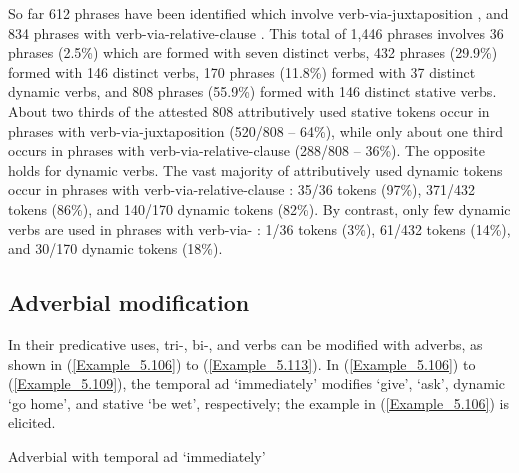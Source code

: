 So far 612  phrases have been identified which involve verb-via-juxtapos\-ition , and 834  phrases with verb-via-relative-clause . This total of 1,446  phrases involves 36  phrases (2.5\%) which are formed with seven distinct  verbs, 432  phrases (29.9\%) formed with 146 distinct  verbs, 170  phrases (11.8\%) formed with 37 distinct  dynamic verbs, and 808  phrases (55.9\%) formed with 146 distinct  stative verbs. About two thirds of the attested 808 attributively used  stative  tokens occur in  phrases with verb-via-juxtapos\-ition  (520/808 – 64\%), while only about one third occurs in  phrases with verb-via-relative-clause  (288/808 – 36\%). The opposite holds for dynamic verbs. The vast majority of attributively used dynamic  tokens occur in  phrases with verb-via-relative-clause : 35/36   tokens (97\%), 371/432   tokens (86\%), and 140/170  dynamic  tokens (82\%). By contrast, only few dynamic verbs are used in  phrases with verb-via- : 1/36   tokens (3\%), 61/432   tokens (14\%), and 30/170  dynamic  tokens (18\%).



\subsection{Adverbial modification}
\label{Para_5.3.3}
In their predicative uses, tri-, bi-, and  verbs can be modified with adverbs, as shown in (\ref{Example_5.106}) to (\ref{Example_5.113}). In (\ref{Example_5.106}) to (\ref{Example_5.109}), the temporal ad  ‘immediately’ modifies   ‘give’,   ‘ask’,  dynamic  ‘go home’, and stative  ‘be wet’, respectively; the example in (\ref{Example_5.106}) is elicited.


\begin{styleExampleTitle}
Adverbial  with temporal ad  ‘immediately’
\end{styleExampleTitle}

